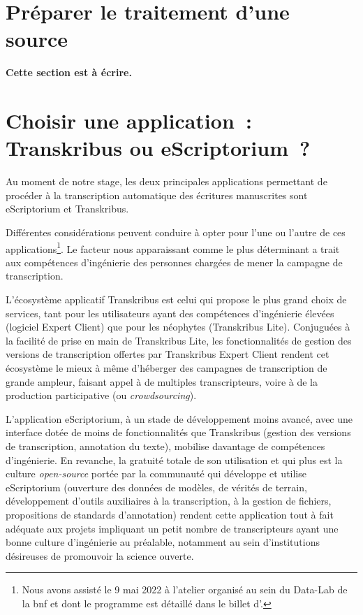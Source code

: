 \documentclass[a4paper,12pt,twoside]{book}
\begin{document}
		\section{Préparer le traitement d'une source}
			\textbf{Cette section est à écrire.}
			
		\section{Choisir une application~: Transkribus ou eScriptorium~?}
			Au moment de notre stage, les deux principales applications permettant de procéder à la transcription automatique des écritures manuscrites sont eScriptorium et Transkribus.
			
			Différentes considérations peuvent conduire à opter pour l'une ou l'autre de ces applications\footnote{Nous avons assisté le 9 mai 2022 à l'atelier organisé au sein du Data-Lab de la \gls{bnf} et dont le programme est détaillé dans le billet d'\cite{jacquotTranskribusEScriptoriumTranscrire}.}. Le facteur nous apparaissant comme le plus déterminant a trait aux compétences d'ingénierie des personnes chargées de mener la campagne de transcription.
			
			L'écosystème applicatif Transkribus est celui qui propose le plus grand choix de services, tant pour les utilisateurs ayant des compétences d'ingénierie élevées (logiciel Expert Client) que pour les néophytes (Transkribus Lite). Conjuguées à la facilité de prise en main de Transkribus Lite, les fonctionnalités de gestion des versions de transcription offertes par Transkribus Expert Client rendent cet écosystème le mieux à même d'héberger des campagnes de transcription de grande ampleur, faisant appel à de multiples transcripteurs, voire à de la production participative (ou \textit{crowdsourcing}).
			
			L'application eScriptorium, à un stade de développement moins avancé, avec une interface dotée de moins de fonctionnalités que Transkribus (gestion des versions de transcription, annotation du texte), mobilise davantage de compétences d'ingénierie. En revanche, la gratuité totale de son utilisation et qui plus est la culture \textit{open-source} portée par la communauté qui développe et utilise eScriptorium (ouverture des données de modèles, de vérités de terrain, développement d'outils auxiliaires à la transcription, à la gestion de fichiers, propositions de standards d'annotation) rendent cette application tout à fait adéquate aux projets impliquant un petit nombre de transcripteurs ayant une bonne culture d'ingénierie au préalable, notamment au sein d'institutions désireuses de promouvoir la science ouverte.
			
\end{document}
